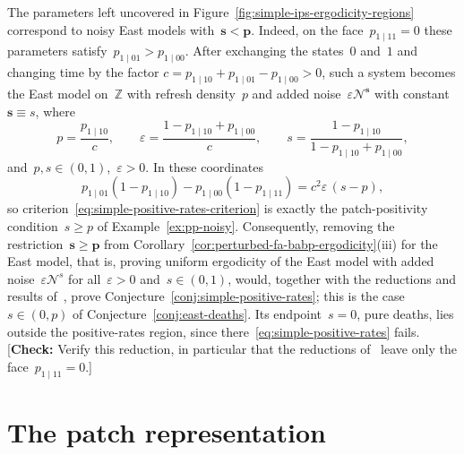 \documentclass[EJP,preprint,NODS,nobera]{ejpecp}
\newcommand{\Z}{\mathbb{Z}}
\newcommand{\bb}[1]{\left(#1\right)}
\newcommand{\mb}[1]{\mathbf{#1}}
\newcommand{\Ncal}{\mathcal{N}}
\newcommand{\authorcheck}[1]{{\color{blue}[\textbf{Check:} #1]}}
\begin{document}
\begin{remark}
\label{rem:simple-remaining-region}
The parameters left uncovered in
Figure~\ref{fig:simple-ips-ergodicity-regions} correspond to noisy East models
with~$\mb s<\mb p$. Indeed, on the face~$p_{1\mid11}=0$ these parameters
satisfy~$p_{1\mid01}>p_{1\mid00}$. After exchanging the states~$0$ and~$1$
and changing time by the factor
$c=p_{1\mid10}+p_{1\mid01}-p_{1\mid00}>0$, such a system becomes the East
model on~$\Z$ with refresh density~$p$ and added noise~$\varepsilon\Ncal^{\mb s}$
with constant~$\mb s\equiv s$, where
\begin{equation*}
p=\frac{p_{1\mid10}}{c},
\qquad
\varepsilon=\frac{1-p_{1\mid10}+p_{1\mid00}}{c},
\qquad
s=\frac{1-p_{1\mid10}}{1-p_{1\mid10}+p_{1\mid00}},
\end{equation*}
and~$p,s\in(0,1)$,~$\varepsilon>0$. In these coordinates
\begin{equation*}
p_{1\mid01}\bb{1-p_{1\mid10}}-p_{1\mid00}\bb{1-p_{1\mid11}}
=
c^2\varepsilon\,(s-p),
\end{equation*}
so criterion~\eqref{eq:simple-positive-rates-criterion} is exactly the
patch-positivity condition~$s\geq p$ of Example~\ref{ex:pp-noisy}. Consequently,
removing the restriction~$\mb s\geq\mb p$ from
Corollary~\ref{cor:perturbed-fa-babp-ergodicity}\textup{(iii)} for the East
model, that is, proving uniform ergodicity of the East model with added
noise~$\varepsilon\Ncal^{s}$ for all~$\varepsilon>0$ and~$s\in(0,1)$, would,
together with the reductions and results
of~\cite{GluchowskiMenz2025,GluchowskiMenz2026}, prove
Conjecture~\ref{conj:simple-positive-rates}; this is the case~$s\in(0,p)$ of
Conjecture~\ref{conj:east-deaths}. Its endpoint~$s=0$, pure deaths, lies
outside the positive-rates region, since there~\eqref{eq:simple-positive-rates}
fails.
\authorcheck{Verify this reduction, in particular that the reductions
of~\cite{GluchowskiMenz2025} leave only the face~$p_{1\mid11}=0$.}
\end{remark}
\section{The patch representation}
\label{sec:probabilistic-interpretation}
\end{document}
